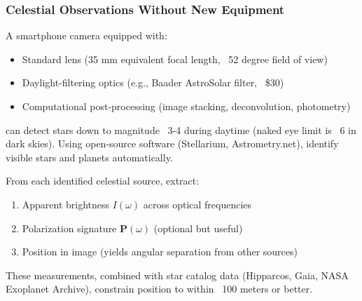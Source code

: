 \documentclass[11pt,twocolumn,a4paper]{article}
\theoremstyle{definition}
\begin{document}
\subsubsection{Celestial Observations Without New Equipment}

A smartphone camera equipped with:
\begin{itemize}[nosep]
\item Standard lens (35 mm equivalent focal length, ~52 degree field of view)
\item Daylight-filtering optics (e.g., Baader AstroSolar filter, ~\$30)
\item Computational post-processing (image stacking, deconvolution, photometry)
\end{itemize}

can detect stars down to magnitude ~3-4 during daytime (naked eye limit is ~6 in dark skies). Using open-source software (Stellarium, Astrometry.net), identify visible stars and planets automatically.

From each identified celestial source, extract:
\begin{enumerate}[nosep]
\item Apparent brightness $I(\omega)$ across optical frequencies
\item Polarization signature $\mathbf{P}(\omega)$ (optional but useful)
\item Position in image (yields angular separation from other sources)
\end{enumerate}

These measurements, combined with star catalog data (Hipparcos, Gaia, NASA Exoplanet Archive), constrain position to within ~100 meters or better.
\end{document}
